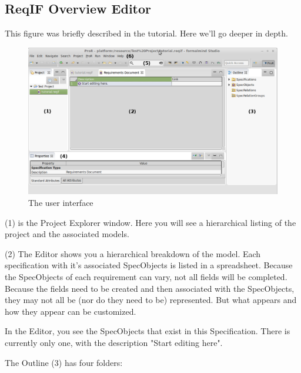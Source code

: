 \subsection{ReqIF Overview Editor}

This figure was briefly described in the tutorial.  Here we'll go deeper in depth.

\begin{figure}[h!]
  \centering
  \includegraphics[width=\linewidth]{../rmf-images/Screenshot_intro.png}
  \caption{The \pror{} user interface}
  \label{fig:user_interface_overview}
\end{figure}

(1) is the Project Explorer window.  Here you will see a hierarchical listing of the project and the associated models.

(2) The Editor shows you a hierarchical breakdown of the model.  Each specification with it's associated SpecObjects is listed in a spreadsheet.  Because the SpecObjects of each requirement can vary, not all fields will be completed.  Because the fields need to  be created and then associated with the SpecObjects, they may not all be (nor do they need to be) represented.  But what appears and how they appear can be customized.

In the Editor, you see the SpecObjects that exist in this Specification.
There is currently only one, with the description "Start editing here".

The Outline (3) has four folders:

